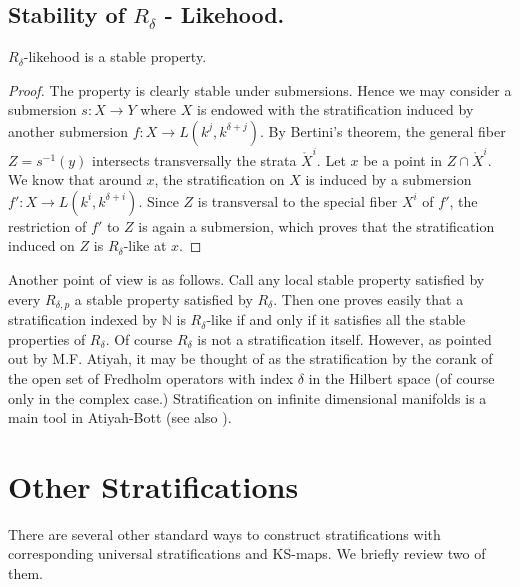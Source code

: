 \setcounter{subsection}{2}
\subsection{Stability of \texorpdfstring{$R_{\delta}$}{Rd} - Likehood.}\label{chap6-sec4.3}

\begin{prop*}
$R_{\delta}$-likehood is a stable property.
\end{prop*}

\begin{proof}
The property is clearly stable under submersions. Hence we may
consider a submersion $s:X\to Y$ where $X$ is endowed with the
stratification induced by another submersion $f:X\to
L(k^{j},k^{\delta+j})$. By Bertini's theorem, the general fiber
$Z=s^{-1}(y)$ intersects transversally the strata $\ring{X}^{i}$. Let
$x$ be a point in $Z\cap \ring{X}^{i}$. We know that around $x$, the
stratification on $X$ is induced by a submersion $f':X\to
L(k^{i},k^{\delta+i})$. Since $Z$ is transversal to the special fiber
$X^{i}$ of $f'$, the restriction of $f'$ to $Z$ is again a submersion,
which proves that the stratification induced on $Z$ is
$R_{\delta}$-like at $x$.
\end{proof}

\setcounter{subremark}{3}
\begin{subremark}\label{chap6-rem4.4}
Another point of view is as follows. Call any local stable property
satisfied by every $R_{\delta,p}$ a stable property satisfied by
$R_{\delta}$. Then one proves easily that a stratification indexed by
$\mathbb{N}$ is $R_{\delta}$-like if and only if it satisfies all the
stable properties of $R_{\delta}$. Of course $R_{\delta}$ is not a
stratification itself. However, as pointed out by M.F. Atiyah, it may
be thought of as the stratification by the corank of the open set of
Fredholm operators with index $\delta$ in the Hilbert space (of course
only in the complex case.) Stratification on infinite dimensional
manifolds is a main tool in Atiyah-Bott \cite{chap6-AB} (see
also \cite{chap6-Ki}). 
\end{subremark}

\section{Other Stratifications}\label{chap6-sec5}

There are several other standard ways to construct stratifications
with corresponding universal stratifications and KS-maps. We briefly
review two of them.

